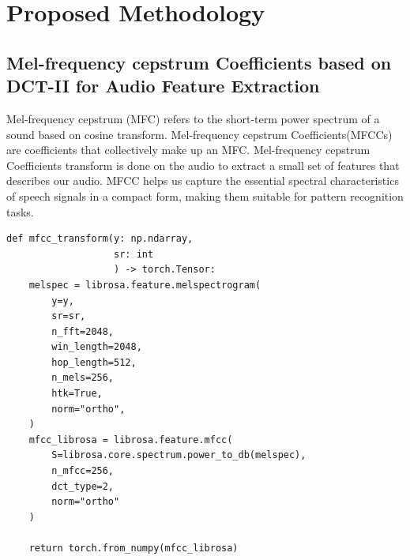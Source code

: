 \documentclass[fleqn, 10pt, twoside]{IOEGC}
\begin{document}
\section{Proposed Methodology}
\subsection{Mel-frequency cepstrum Coefficients based on DCT-II for Audio Feature Extraction
}
Mel-frequency cepstrum (MFC) refers to the short-term power spectrum of a sound
based on cosine transform. Mel-frequency cepstrum Coefficients(MFCCs) are coefficients that collectively make up an MFC. Mel-frequency cepstrum Coefficients transform is done on the audio to extract a small set of features that describes our audio.
MFCC helps us capture the essential spectral characteristics of speech signals in a
compact form, making them suitable for pattern recognition tasks.
\begin{lstlisting}[style=mystyle,caption={MFCC Transformation Function},captionpos=b]
def mfcc_transform(y: np.ndarray,
                   sr: int
                   ) -> torch.Tensor:
    melspec = librosa.feature.melspectrogram(
        y=y,
        sr=sr,
        n_fft=2048,
        win_length=2048,
        hop_length=512,
        n_mels=256,
        htk=True,
        norm="ortho",
    )
    mfcc_librosa = librosa.feature.mfcc(
        S=librosa.core.spectrum.power_to_db(melspec),
        n_mfcc=256,
        dct_type=2,
        norm="ortho"
    )

    return torch.from_numpy(mfcc_librosa)
\end{lstlisting}
\end{document}
